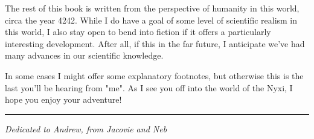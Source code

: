 The rest of this book is written from the perspective of humanity in this
world, circa the year 4242. While I do have a goal of some level of scientific
realism in this world, I also stay open to bend into fiction if it offers a
particularly interesting development. After all, if this in the far future, I
anticipate we've had many advances in our scientific knowledge.

In some cases I might offer some explanatory footnotes, but otherwise this is
the last you'll be hearing from "me". As I see you off into the world of the
Nyxi, I hope you enjoy your adventure! \\[48pt]
\hrule

\begin{center}
  \textit{Dedicated to Andrew, from Jacovie and Neb}
\end{center}

\pagestyle{fancy} %